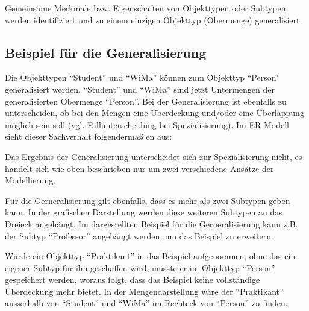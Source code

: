 Gemeinsame Merkmale bzw. Eigenschaften von Objekttypen oder Subtypen werden identifiziert und zu einem einzigen Objekttyp (Obermenge) generalisiert.
\subsection{Beispiel für die Generalisierung}
Die Objekttypen \enquote{Student} und \enquote{WiMa} können zum Objekttyp \enquote{Person} generalisiert werden. \enquote{Student} und \enquote{WiMa} sind jetzt Untermengen der generalisierten Obermenge \enquote{Person}. Bei der Generalisierung ist ebenfalls zu unterscheiden, ob bei den Mengen eine Überdeckung und/oder eine Überlappung möglich sein soll (vgl. Fallunterscheidung bei Spezialisierung). Im ER-Modell sieht dieser Sachverhalt folgendermaß en aus:
\begin{center}
\end{center}
Das Ergebnis der Generalisierung unterscheidet sich zur Spezialisierung nicht, es handelt sich wie oben beschrieben nur um zwei verschiedene Ansätze der Modellierung.

Für die Gerneralisierung gilt ebenfalls, dass es mehr als zwei Subtypen geben kann. In der grafischen Darstellung werden diese weiteren Subtypen an das Dreieck angehängt. Im dargestellten Beispiel für die Gerneralisierung kann z.B. der Subtyp \enquote{Professor} angehängt werden, um das Beispiel zu erweitern.

Würde ein Objekttyp \enquote{Praktikant} in das Beispiel aufgenommen, ohne das ein eigener Subtyp für ihn geschaffen wird, müsste er im Objekttyp \enquote{Person} gespeichert werden, woraus folgt, dass das Beispiel keine vollständige Überdeckung mehr bietet. In der Mengendarstellung wäre der \enquote{Praktikant} ausserhalb von \enquote{Student} und \enquote{WiMa} im Rechteck von \enquote{Person} zu finden.
\clearpage
